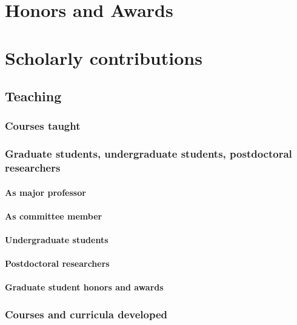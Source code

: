 \section{Honors and Awards}



\section{Scholarly contributions}

\subsection{Teaching}

\subsubsection{Courses taught}


\subsubsection{Graduate students, undergraduate students, postdoctoral researchers}

\paragraph{As major professor}


\paragraph{As committee member}


\paragraph{Undergraduate students}


\paragraph{Postdoctoral researchers}


\paragraph{Graduate student honors and awards}


\subsubsection{Courses and curricula developed}


